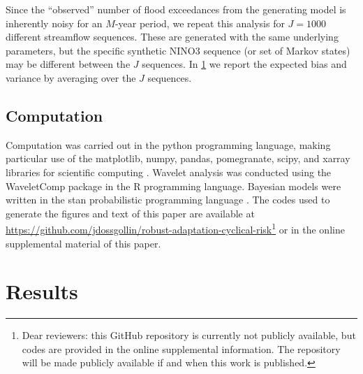 \documentclass[
]{agujournal2018}
\begin{document}
Since the ``observed'' number of flood exceedances from the generating model is inherently noisy for an $M$-year period, we repeat this analysis for $J=1000$ different streamflow sequences.
These are generated with the same underlying parameters, but the specific synthetic NINO3 sequence (or set of Markov states) may be different between the $J$ sequences.
In \cref{sec:results} we report the expected bias and variance by averaging over the $J$ sequences.

\subsection{Computation}\label{sec:methods-computation}

Computation was carried out in the python programming language, making particular use of the matplotlib, numpy, pandas, pomegranate, scipy, and xarray libraries for scientific computing \citep{Hunter:2007ih, vanderWalt:2011dp, McKinney:2010un, Schreiber:2017tg, Jones:2001uv, Hoyer:2017hs}.
Wavelet analysis was conducted using the WaveletComp package \citep{Roesch:wlBQQoIs} in the R programming language.
Bayesian models were written in the stan probabilistic programming language \citep{Carpenter:2017ke}.
The codes used to generate the figures and text of this paper are available at \url{https://github.com/jdossgollin/robust-adaptation-cyclical-risk}\footnote{Dear reviewers: this GitHub repository is currently not publicly available, but codes are provided in the online supplemental information. The repository will be made publicly available if and when this work is published.} or in the online supplemental material of this paper.


\section{Results}\label{sec:results}
\end{document}
